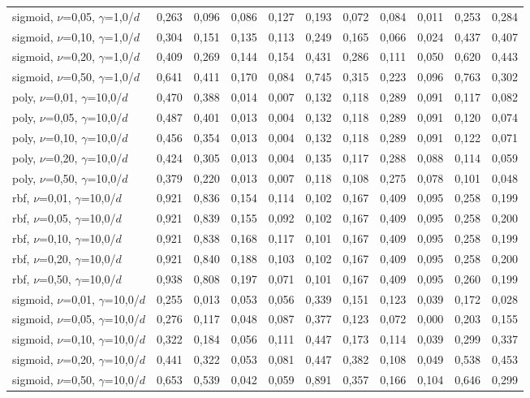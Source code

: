 \begin{longtable}{lrrrrrrrrrr}
sigmoid, $\nu$=0,05, $\gamma$=1,0/$d$ & 0,263 & 0,096 & 0,086 & 0,127 & 0,193 & 0,072 & 0,084 & 0,011 & 0,253 & 0,284 \\
sigmoid, $\nu$=0,10, $\gamma$=1,0/$d$ & 0,304 & 0,151 & 0,135 & 0,113 & 0,249 & 0,165 & 0,066 & 0,024 & 0,437 & 0,407 \\
sigmoid, $\nu$=0,20, $\gamma$=1,0/$d$ & 0,409 & 0,269 & 0,144 & 0,154 & 0,431 & 0,286 & 0,111 & 0,050 & 0,620 & 0,443 \\
sigmoid, $\nu$=0,50, $\gamma$=1,0/$d$ & 0,641 & 0,411 & 0,170 & 0,084 & 0,745 & 0,315 & 0,223 & 0,096 & 0,763 & 0,302 \\
poly, $\nu$=0,01, $\gamma$=10,0/$d$ & 0,470 & 0,388 & 0,014 & 0,007 & 0,132 & 0,118 & 0,289 & 0,091 & 0,117 & 0,082 \\
poly, $\nu$=0,05, $\gamma$=10,0/$d$ & 0,487 & 0,401 & 0,013 & 0,004 & 0,132 & 0,118 & 0,289 & 0,091 & 0,120 & 0,074 \\
poly, $\nu$=0,10, $\gamma$=10,0/$d$ & 0,456 & 0,354 & 0,013 & 0,004 & 0,132 & 0,118 & 0,289 & 0,091 & 0,122 & 0,071 \\
poly, $\nu$=0,20, $\gamma$=10,0/$d$ & 0,424 & 0,305 & 0,013 & 0,004 & 0,135 & 0,117 & 0,288 & 0,088 & 0,114 & 0,059 \\
poly, $\nu$=0,50, $\gamma$=10,0/$d$ & 0,379 & 0,220 & 0,013 & 0,007 & 0,118 & 0,108 & 0,275 & 0,078 & 0,101 & 0,048 \\
rbf, $\nu$=0,01, $\gamma$=10,0/$d$ & 0,921 & 0,836 & 0,154 & 0,114 & 0,102 & 0,167 & 0,409 & 0,095 & 0,258 & 0,199 \\
rbf, $\nu$=0,05, $\gamma$=10,0/$d$ & 0,921 & 0,839 & 0,155 & 0,092 & 0,102 & 0,167 & 0,409 & 0,095 & 0,258 & 0,200 \\
rbf, $\nu$=0,10, $\gamma$=10,0/$d$ & 0,921 & 0,838 & 0,168 & 0,117 & 0,101 & 0,167 & 0,409 & 0,095 & 0,258 & 0,199 \\
rbf, $\nu$=0,20, $\gamma$=10,0/$d$ & 0,921 & 0,840 & 0,188 & 0,103 & 0,102 & 0,167 & 0,409 & 0,095 & 0,258 & 0,200 \\
rbf, $\nu$=0,50, $\gamma$=10,0/$d$ & 0,938 & 0,808 & 0,197 & 0,071 & 0,101 & 0,167 & 0,409 & 0,095 & 0,260 & 0,199 \\
sigmoid, $\nu$=0,01, $\gamma$=10,0/$d$ & 0,255 & 0,013 & 0,053 & 0,056 & 0,339 & 0,151 & 0,123 & 0,039 & 0,172 & 0,028 \\
sigmoid, $\nu$=0,05, $\gamma$=10,0/$d$ & 0,276 & 0,117 & 0,048 & 0,087 & 0,377 & 0,123 & 0,072 & 0,000 & 0,203 & 0,155 \\
sigmoid, $\nu$=0,10, $\gamma$=10,0/$d$ & 0,322 & 0,184 & 0,056 & 0,111 & 0,447 & 0,173 & 0,114 & 0,039 & 0,299 & 0,337 \\
sigmoid, $\nu$=0,20, $\gamma$=10,0/$d$ & 0,441 & 0,322 & 0,053 & 0,081 & 0,447 & 0,382 & 0,108 & 0,049 & 0,538 & 0,453 \\
sigmoid, $\nu$=0,50, $\gamma$=10,0/$d$ & 0,653 & 0,539 & 0,042 & 0,059 & 0,891 & 0,357 & 0,166 & 0,104 & 0,646 & 0,299 \\
\bottomrule
\end{longtable}
